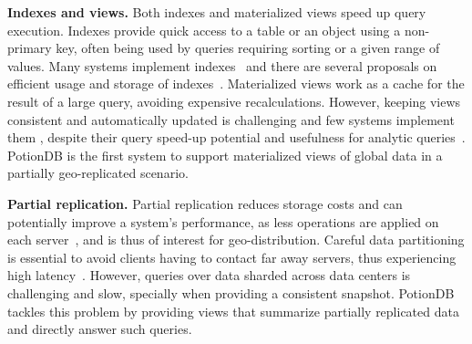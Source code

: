 \documentclass[sigplan,twocolumn,review,anonymous]{acmart}
\newcommand{\andre}[1]{\nbnote{Andre}{blue}{#1}}
\begin{document}
\noindent
\textbf{Indexes and views.}
Both indexes and materialized views speed up query execution.
Indexes provide quick access to a table or an object using a non-primary key, often being used by queries requiring sorting or a given range of values.
Many systems implement indexes~\cite{dynamo, couchDB, cassandra, megastore} and there are several proposals on efficient usage and storage of indexes~\cite{lee2020asymmetric, lisa, bindex, slik, xiong2024civet, xu2024bp, hao2024bf}.
Materialized views work as a cache for the result of a large query, avoiding expensive %
recalculations.
However, keeping views consistent and automatically updated is challenging \cite{oracleViews, chronocache, birds, budiu2023dbsp} and few systems implement them \cite{chronocache, marviq, estocada, couchDB, oracleViews, noria, clickhouse2024}, %
despite their %
query speed-up potential and usefulness for analytic queries~\cite{analyticdb, hadad, sioulas2023real, clickhouse2024}.
PotionDB is the first system to support materialized views of global data in a partially geo-replicated scenario.



\noindent
\textbf{Partial replication.}
Partial replication reduces storage costs and can potentially improve a system's performance, as less operations are applied on each server~\cite{sipre, optimisticPartial, coda, nguyen2023detock}, and is thus of interest for geo-distribution.
Careful data partitioning is essential to avoid clients having to contact far away servers, thus experiencing high latency~\cite{sipre, optimisticPartial, coda}.
However, queries over data sharded across data centers is challenging and slow, specially when providing a consistent snapshot.
PotionDB tackles this problem by providing views that summarize partially replicated data and directly answer such queries.
\end{document}
